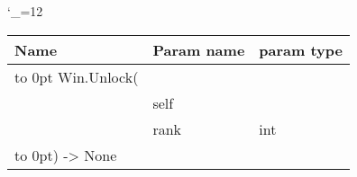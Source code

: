 \begingroup \catcode`\_=12 \tt
\begin{tabular}{lll}
\toprule
\textrm{Name}&\textrm{Param name}&\textrm{param type}\\
\midrule
\hbox to 0pt {Win.Unlock(\hss}\\
& self\\
& rank & int\\
\hbox to 0pt{) -> None\hss}\\
\bottomrule
\end{tabular}
\endgroup
